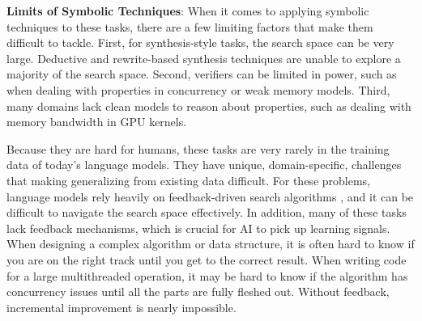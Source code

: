 \textbf{Limits of Symbolic Techniques}: When it comes to applying symbolic techniques to these tasks, there are a few limiting factors that make them difficult to tackle. First, for synthesis-style tasks, the search space can be very large. Deductive and rewrite-based synthesis techniques are unable to explore a majority of the search space. Second, verifiers can be limited in power, such as when dealing with properties in concurrency or weak memory models. Third, many domains lack clean models to reason about properties, such as dealing with memory bandwidth in GPU kernels. 

Because they are hard for humans, these tasks are very rarely in the training data of today's language models. They have unique, domain-specific, challenges that making generalizing from existing data difficult. For these problems, language models rely heavily on feedback-driven search algorithms \citep{mankowitz2023faster}, and it can be difficult to navigate the search space effectively. In addition, many of these tasks lack feedback mechanisms, which is crucial for AI to pick up learning signals. When designing a complex algorithm or data structure, it is often hard to know if you are on the right track until you get to the correct result. When writing code for a large multithreaded operation, it may be hard to know if the algorithm has concurrency issues until all the parts are fully fleshed out. Without feedback, incremental improvement is nearly impossible.


